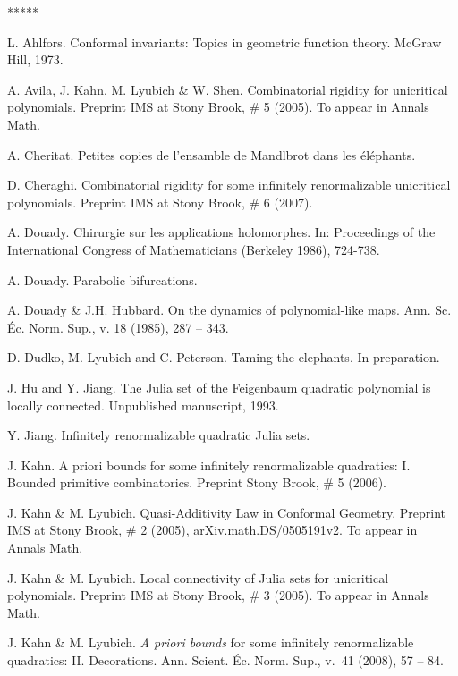 
\begin{thebibliography}{*****}


 L. Ahlfors. Conformal invariants: Topics in geometric function theory. McGraw Hill, 1973.

 A. Avila, J. Kahn, M. Lyubich \& W. Shen. 
   Combinatorial rigidity for unicritical polynomials. 
   Preprint IMS at Stony Brook, \# 5 (2005). To appear in Annals Math.

 A. Cheritat. 
  Petites copies de l'ensamble de Mandlbrot dans les \'el\'ephants. 

 D. Cheraghi. Combinatorial rigidity for some infinitely renormalizable
  unicritical polynomials.  Preprint IMS at Stony Brook, \# 6 (2007). 

 A. Douady. Chirurgie sur les applications holomorphes.
 In: Proceedings of the International Congress of Mathematicians
 (Berkeley 1986), 724-738.

 A. Douady.  Parabolic bifurcations.

 A. Douady \& J.H. Hubbard. On the dynamics of polynomial-like maps.
    Ann. Sc. \'{E}c. Norm. Sup., v. 18 (1985), 287 -- 343.

 D. Dudko, M. Lyubich and C. Peterson.
Taming the elephants. In preparation.     
    
  J. Hu and Y. Jiang.
The Julia set of the Feigenbaum quadratic polynomial is locally
connected. Unpublished manuscript, 1993. 

  
 Y. Jiang.  
  Infinitely renormalizable quadratic Julia sets. 

 J. Kahn. A priori bounds for some infinitely renormalizable quadratics: I.
                  Bounded primitive combinatorics. Preprint Stony Brook, \# 5 (2006).   


 J. Kahn \& M. Lyubich.
   Quasi-Additivity Law in Conformal Geometry. 
    Preprint IMS at Stony Brook, \# 2 (2005),  arXiv.math.DS/0505191v2. 
   To appear in Annals Math. 

 J. Kahn \& M. Lyubich. 
  Local connectivity of Julia sets for unicritical polynomials. 
 Preprint IMS at Stony Brook, \# 3 (2005). To appear in Annals Math. 

 J. Kahn \& M. Lyubich. {\it A priori bounds} for some infinitely
renormalizable quadratics: II.  Decorations.
Ann. Scient. \'Ec. Norm. Sup., v.~41 (2008), 57 -- 84.


\end{thebibliography}
